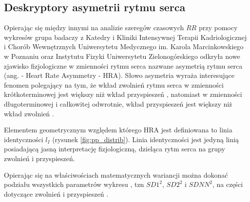 \subsection{Deskryptory asymetrii rytmu serca}

Opierając się między innymi na analizie szeregów czasowych $RR$ przy pomocy wykresów \PP{}
grupa badaczy z Katedry i Kliniki Intensywnej Terapii Kadriologicznej i Chorób Wewnętrznych
Uniwersytetu Medycznego im. Karola Marcinkowskiego w Poznaniu oraz Instytutu Fizyki
Uniwersytetu Zielonogórskiego odkryła nowe zjawisko fizjologiczne w zmienności rytmu serca
nazwane asymetrią rytmu serca (ang. - Heart Rate Asymmetry - HRA). Słowo asymetria wyraża interesujące fenomen polegający na
tym, że wkład zwolnień rytmu serca w zmienności krótkoterminowej jest większy niż wkład
przyspieszeń \cite{guasym, biomed, geomasy,  berlinPrzemek,  annals, asym1, asym2,  asym3, asym4, asym5, asym6, asym7, car}, natomiast w zmienności długoterminowej i całkowitej odwrotnie, wkład
przyspieszeń jest większy niż wkład zwolnień \cite{guasym, berlinPrzemek,  annals}.

Elementem geometrycznym względem którego HRA jest definiowana to linia identyczności $l_{I}$ (rysunek \ref{fig:pp_distrib}). Linia identyczności jest jedyną linią posiadającą jasną interpretację fizjologiczną, dzieląca
rytm serca na grupy zwolnień i przyspieszeń.

Opierając się na właściwościach matematycznych wariancji można dokonać podziału wszystkich
parametrów wykresu \PP{}, tzn $SD1^2$, $SD2^2$ i $SDNN^2$, na części dotyczące zwolnień i 
przyspieszeń \cite{geomasy, annals, partitioning}.

